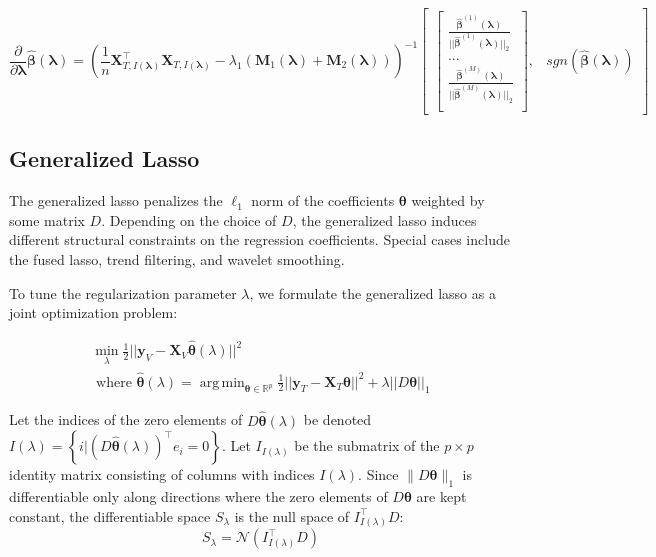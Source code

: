 \documentclass[10pt,letterpaper]{article}
\DeclareMathOperator*{\argmin}{arg\,min}
\begin{document}
\begin{equation}
\frac{\partial}{\partial \boldsymbol\lambda} \hat{\boldsymbol{\beta}}(\boldsymbol{\lambda}) =
\left (
\frac{1}{n} \boldsymbol{X}_{T, I(\boldsymbol\lambda)}^\top \boldsymbol{X}_{T, I(\boldsymbol\lambda)}
- \lambda_1 \left(\boldsymbol{M}_1(\boldsymbol\lambda) + \boldsymbol{M}_2(\boldsymbol\lambda) \right)
\right ) ^{-1}
\begin{bmatrix}
\begin{bmatrix}
\frac{\hat{\boldsymbol{\beta}}^{(1)}(\boldsymbol \lambda)}{||\hat{\boldsymbol{\beta}}^{(1)} (\boldsymbol \lambda)||_2}\\
...\\
\frac{\hat{\boldsymbol \beta}^{(M)} (\boldsymbol \lambda)}{||\hat{\boldsymbol{\beta}}^{(M)}(\boldsymbol \lambda)||_2}\\
\end{bmatrix},
&
sgn(\hat{\boldsymbol{\beta}}(\boldsymbol{\lambda}))
\end{bmatrix}
\end{equation}


\subsection{Generalized Lasso}
The generalized lasso \citep{roth2004generalized} penalizes the $\ell_1$ norm of the coefficients $\boldsymbol \theta$ weighted by some matrix $D$. Depending on the choice of $D$, the generalized lasso induces different structural constraints on the regression coefficients. Special cases include the fused lasso, trend filtering, and wavelet smoothing.

To tune the regularization parameter $\lambda$, we formulate the generalized lasso as a joint optimization problem:

\begin{equation}
\begin{array}{c}
\min_{\lambda} \frac{1}{2} \lvert\lvert \boldsymbol{y}_V - \boldsymbol{X}_V \hat{\boldsymbol{\theta}} (\lambda) \rvert\rvert ^2 \\
\text{ where }
\hat{\boldsymbol{\theta}} (\lambda) =
\argmin_{\boldsymbol{\theta} \in \mathbb{R}^p}
\frac{1}{2} \lvert\lvert \boldsymbol{y}_T - \boldsymbol{X}_T \boldsymbol{\theta} \rvert\rvert ^2
+ \lambda \lvert\lvert D \boldsymbol{\theta} \rvert \rvert_1
\end{array}
\label{genlasso}
\end{equation}

Let the indices of the zero elements of $D \hat{\boldsymbol{\theta}}(\lambda)$ be denoted $I(\lambda) = \left \{i | (D \hat{\boldsymbol{\theta}}(\lambda))^\top e_i = 0 \right \}$.
Let $I_{I(\lambda)}$ be the submatrix of the $p \times p$ identity matrix consisting of columns with indices $I(\lambda)$. Since $\|D \boldsymbol{\theta}\|_1$ is differentiable only along directions where the zero elements of $D \boldsymbol{\theta}$ are kept constant, the differentiable space $S_\lambda$ is the null space of $I_{I(\lambda)}^\top D$:
\begin{equation}
S_\lambda = \mathcal{N}(I_{I(\lambda)}^\top D)
\end{equation}
\end{document}
